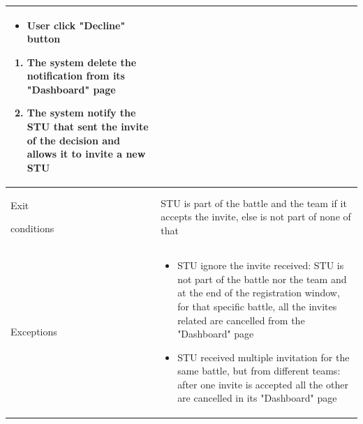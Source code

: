 \begin{center}
\begin{tabular}{| m{2cm} | m{10cm}|}
\begin{enumerate}
                                        \begin{itemize}
                                            \item User click "Decline" button
                                        \end{itemize} 
                                            \begin{enumerate}
                                                \item The system delete the notification from its "Dashboard" page
                                                \item The system notify the STU that sent the invite of the decision and allows it to invite a new STU
                                            \end{enumerate}
                                \end{enumerate}                      \\ \hline
        Exit \par conditions  &  STU is part of the battle and the team if it accepts the invite, else is not part of none of that                                          \\ \hline
        Exceptions            & \begin{itemize}
                                    \item STU ignore the invite received: STU is not part of the battle nor the team and at the end of the registration window, for that specific battle, all the invites related are cancelled from the "Dashboard" page
                                    \item STU received multiple invitation for the same battle, but from different teams: after one invite is accepted all the other are cancelled in its "Dashboard" page
                                \end{itemize}                        \\ \hline
    \end{tabular}
\end{center}

